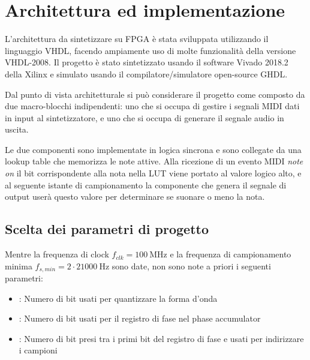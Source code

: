 \newcommand{\blockdiagram}[4]{
	\begin{tikzpicture}[font=\sffamily,>=triangle 45]
         \node [circuit] (item) {};
		
		\matrix[
		matrix of nodes,
		left= of item,
		row sep=\myheight/15,
		nodes={anchor=east}
		] (rightmatr) {
			#3
			\\
		};
		\matrix[
		matrix of nodes,
		right= of item,
		row sep=\myheight/15,
		nodes={anchor=west}
		] (leftmatr) {
			#4
			\\
		};
	
		\foreach \i in {1,...,#1}
			\draw [->] (rightmatr-\i-1) -- (rightmatr-\i-1 -| item.west);
		\foreach \i in {1,...,#2}
			\draw [<-] (leftmatr-\i-1) -- (leftmatr-\i-1 -| item.east);
	\end{tikzpicture}
}


\chapter{Architettura ed implementazione}

L'architettura da sintetizzare su FPGA è stata sviluppata utilizzando il linguaggio VHDL, facendo
ampiamente uso di molte funzionalità della versione VHDL-2008.
Il progetto è stato sintetizzato usando il software Vivado 2018.2 della Xilinx e simulato usando il compilatore/simulatore open-source GHDL.

Dal punto di vista architetturale si può considerare il progetto come composto da due macro-blocchi indipendenti: uno che si occupa di gestire i segnali MIDI dati in input al sintetizzatore, e uno che si occupa di generare il segnale audio in uscita.

Le due componenti sono implementate in logica sincrona e sono collegate da una lookup table che memorizza le note attive. Alla ricezione di un evento MIDI \textit{note on} il bit corrispondente alla nota nella LUT viene portato al valore logico alto, e al seguente istante di campionamento la componente che genera il segnale di output userà questo valore per determinare se suonare o meno la nota.

\section{Scelta dei parametri di progetto}
Mentre la frequenza di clock $f_{clk} = \SI{100}{\mega\hertz}$ e 
la frequenza di campionamento minima $f_{s,min} = 2 \cdot \SI{21000}{\hertz}$
sono date, non sono note a priori i seguenti parametri:
\begin{itemize}
    \item \textbf{}: Numero di bit usati per quantizzare la forma d'onda
    \item \textbf{}: Numero di bit usati per il registro di fase nel phase accumulator
    \item \textbf{}: Numero di bit presi tra i primi bit del registro di fase e usati per indirizzare i campioni
\end{itemize}

